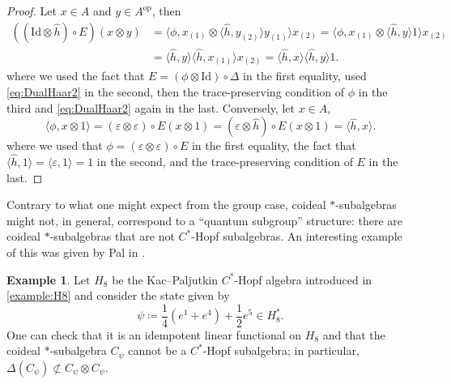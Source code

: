 \documentclass[a4paper,10pt]{amsart}
\newcommand{\eval}[2]{\langle #1 , #2\rangle}
\theoremstyle{definition}
\newtheorem{example}[theorem]{Example}
\begin{document}

\begin{proof}
    Let $x\in A$ and $y\in A^{\mathrm{op}}$, then
    \begin{align*}
        ((\mathrm{Id} \otimes \hat{h})\circ E)(x\otimes y)
        &= \eval{\phi}{x_{(1)}\otimes \eval{\hat{h}}{y_{(2)}}y_{(1)}}x_{(2)} = \eval{\phi}{x_{(1)}\otimes \eval{\hat{h}}{y} 1}x_{(2)}\\
        &= \eval{\hat{h}}{y}\eval{\hat{h}}{x_{(1)}}x_{(2)} = \eval{\hat{h}}{x}\eval{\hat{h}}{y} 1.
    \end{align*}
    where we used the fact that $E = (\phi \otimes \mathrm{Id}) \circ \Delta$ in the first equality, used \cref{eq:DualHaar2} in the second, then the trace-preserving condition of $\phi$ in the third and \cref{eq:DualHaar2} again in the last. Conversely, let $x\in A$, 
    \[
        \eval{\phi}{x \otimes 1}
       = (\varepsilon \otimes  \varepsilon) \circ E(x\otimes 1)
        = (\varepsilon \otimes  \hat{h}) \circ E(x\otimes 1)
        =\eval{\hat{h}}{x}.
    \]
    where we used that $\phi = (\varepsilon \otimes \varepsilon)\circ E$ in the first equality, the fact that $\eval{\hat{h}}{1}=  \eval{\varepsilon}{1} = 1$ in the second, and the trace-preserving condition of $E$ in the last.
\end{proof}

Contrary to what one might expect from the group case, coideal $*$-subalgebras might not, in general, correspond to a ``quantum subgroup'' structure: there are coideal $*$-sub\-al\-ge\-bras that are not $C^*$-Hopf subalgebras. An interesting example of this was given by Pal in \cite{pal_counterexample_1996}.
\begin{example}
    Let $H_8$ be the Kac--Paljutkin $C^*$-Hopf algebra introduced in \cref{example:H8} and consider the state given by
    \[
        \psi
        \coloneqq
        \frac{1}{4} (e^1+e^4) + \frac{1}{2} e^5
        \in H_8^*.
    \]
    One can check that it is an idempotent linear functional on $H_8$ and that the coideal $*$-subalgebra $C_\psi$ cannot be a $C^*$-Hopf subalgebra; in particular, $\Delta(C_\psi) \not\subset C_\psi \otimes C_\psi$.
\end{example}
\end{document}
